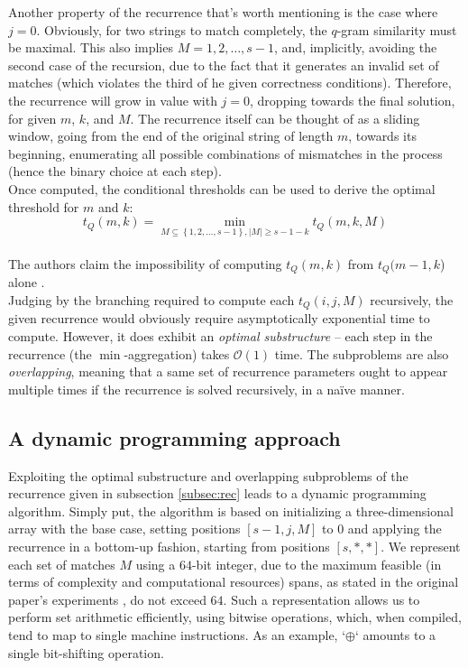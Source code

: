 \documentclass[paper=a4, fontsize=11pt]{scrartcl} %
\numberwithin{equation}{section} %
\numberwithin{figure}{section} %
\numberwithin{table}{section} %
\begin{document}
Another property of the recurrence that's worth mentioning is the case where $j = 0$. Obviously, for two strings to match completely, the $q$-gram similarity must be maximal. This also implies $M = {1, 2, \dots,  s - 1}$, and, implicitly, avoiding the second case of the recursion, due to the fact that it generates an invalid set of matches (which violates the third of he given correctness conditions). Therefore, the recurrence will grow in value with $ j = 0 $, dropping towards the final solution, for given $ m $, $ k $, and $ M$. The recurrence itself can be thought of as a sliding window, going from the end of the original string of length $m$, towards its beginning, enumerating all possible combinations of mismatches in the process (hence the binary choice at each step).  \\

Once computed, the conditional thresholds can be used to derive the optimal threshold for $ m $ and $ k $:
\begin{equation*}
  t_Q(m, k) = \min_{M \subseteq \left\{1, 2, \dots, s - 1\right\}, |M| \geq s - 1 - k} t_Q(m, k, M) 
\end{equation*} \\
The authors claim the impossibility of computing $t_Q(m, k)$ from $t_Q(m - 1, k$) alone \cite{njihovPaper}. \\

Judging by the branching required to compute each $t_Q(i, j, M)$ recursively, the given recurrence would obviously require asymptotically exponential time to compute.
However, it does exhibit an \textit{optimal substructure} -- each step in the recurrence (the $\min$-aggregation) takes $\mathcal{O}(1)$ time. The subproblems are also \textit{overlapping}, meaning that a same set of recurrence parameters ought to appear multiple times if the recurrence is solved recursively, in a naïve manner.

\subsection{A dynamic programming approach}
\label{subsec:dynprog}
Exploiting the optimal substructure and overlapping subproblems of the recurrence given in subsection \ref{subsec:rec} leads to a dynamic programming algorithm.
Simply put, the algorithm is based on initializing a three-dimensional array with the base case, setting positions $\left[s - 1, j, M \right]$ to $0$ and applying the recurrence in a bottom-up fashion, starting from positions $ [s, *, *] $. We represent each set of matches $M$ using a $64$-bit integer, due to the maximum feasible (in terms of complexity and computational resources) spans, as stated in the original paper's experiments \cite{njihovPaper}, do not exceed $64$. Such a representation allows us to perform set arithmetic efficiently, using bitwise operations, which, when compiled, tend to map to single machine instructions. As an example, `$\oplus$` amounts to a single bit-shifting operation. \\
\end{document}

